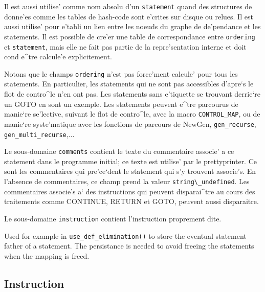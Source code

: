 Il est aussi utilise' comme nom absolu d'un \verb/statement/ quand des
structures de donne'es comme les tables de hash-code sont e'crites sur
disque ou relues. Il est aussi utilise' pour e'tabli un lien entre les
noeuds du graphe de de'pendance et les statements. Il est possible de
cre'er une table de correspondance entre \verb/ordering/ et
\verb/statement/, mais elle ne fait pas partie de la repre'sentation
interne et doit cond e^tre calcule'e explicitement.

Notons que le champs \verb/ordering/ n'est pas force'ment calcule' pour
tous les statements. En particulier, les statements qui ne sont pas
accessibles d'apre`s le flot de contro^le n'en ont pas. Les statements
sans e'tiquette se trouvant derrie`re un GOTO en sont un exemple. Les
statements peuvent e^tre parcourus de manie`re se'lective, suivant le
flot de contro^le, avec la macro \verb/CONTROL_MAP/, ou de manie`re
syste'matique avec les fonctions de parcours de NewGen,
\verb/gen_recurse/,
\verb/gen_multi_recurse/,...

Le sous-domaine {\tt comments} contient le texte du commentaire associe'
a ce statement dans le programme initial; ce texte est utilise' par le
prettyprinter. Ce sont les commentaires qui pre'ce`dent le statement
qui s'y trouvent associe's. En l'absence de commentaires, ce champ
prend la valeur \verb/string\_undefined/. Les commentaires associe's a`
des instructions qui peuvent disparai^tre au cours des traitements comme
CONTINUE, RETURN et GOTO, peuvent aussi disparaitre.

Le sous-domaine \verb/instruction/ contient
l'instruction proprement dite.

{}

Used for example in \verb/use_def_elimination()/ to store the eventual
statement father of a statement. The persistance is needed to avoid
freeing the statements when the mapping is freed.

\subsection{Instruction}
\label{subsection-instruction}


